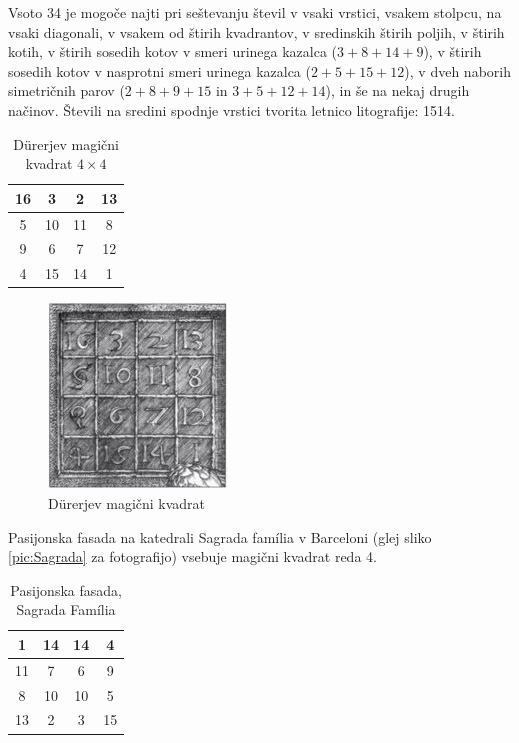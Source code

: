 \documentclass[a4paper,12pt]{article}
\theoremstyle{definition}
\theoremstyle{plain}
\newenvironment{magic}[3]{
   \begin{table}%
   \centering%
   \caption{#2}%
   \label{#3}%
   \large
   \begin{tabular}{|*{#1}{c|}}%
      \hline
}{
   \end{tabular}%
   \end{table}%
}
\begin{document}
Vsoto 34 je mogoče najti pri seštevanju števil v vsaki vrstici, vsakem stolpcu,
na vsaki diagonali, v vsakem od štirih kvadrantov, v sredinskih štirih poljih,
v štirih kotih, v štirih sosedih kotov v smeri urinega kazalca ($3 + 8 + 14 + 9$), v
štirih sosedih kotov v nasprotni smeri urinega kazalca ($2 + 5 + 15 + 12$), v dveh naborih
simetričnih parov ($2 + 8 + 9 + 15$ in $3 + 5 + 12 + 14$), in še na nekaj drugih načinov.
Števili na sredini spodnje vrstici tvorita letnico litografije: 1514.
\begin{magic}{4}{Dürerjev magični kvadrat $4 \times 4$}{tab:Durer}
   16 &  3 &  2 & 13 \\\hline
    5 & 10 & 11 &  8 \\\hline
    9 &  6 &  7 & 12 \\\hline
    4 & 15 & 14 &  1 \\\hline
\end{magic}
\begin{figure}[]
   \centering
   \includegraphics[scale=1.3]{durer.png}
   \caption{Dürerjev magični kvadrat}
   \label{pic:Durer}
\end{figure}

Pasijonska fasada na katedrali Sagrada família v Barceloni
(glej sliko \ref{pic:Sagrada} za fotografijo) vsebuje magični kvadrat reda 4.

\begin{magic}{4}{Pasijonska fasada, Sagrada Família}{tab:Sagrada}
    1 & 14 & 14 &  4 \\\hline
   11 &  7 &  6 &  9 \\\hline
    8 & 10 & 10 &  5 \\\hline
   13 &  2 &  3 & 15 \\\hline
\end{magic}
\end{document}
